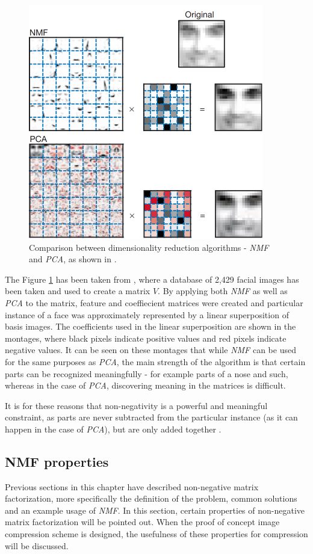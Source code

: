 \documentclass[thesis=M,english]{FITthesis}[2012/10/20]
\begin{document}
\begin{figure}[h]
  \centering
  \includegraphics{nmfpca-comparison}
  \caption[Comparison between dimensionality reduction algorithms]{Comparison between dimensionality reduction algorithms - \emph{NMF} and \emph{PCA},
           as shown in \cite{lee99}.}
  \label{fig:nmfpca-comparison}
\end{figure}

The Figure \ref{fig:nmfpca-comparison} has been taken from \cite{lee99}, where a database of
2,429 facial images has been taken and used to create a matrix $V$. By
applying both \emph{NMF} as well as \emph{PCA} to the matrix, feature
and coeffiecient matrices were created and particular instance of a
face was approximately represented by a linear superposition of basis
images. The coefficients used in the linear superposition are shown in the
montages, where black pixels indicate positive values and red pixels indicate
negative values. It can be seen on these montages that while \emph{NMF}
can be used for the same purposes as \emph{PCA}, the main strength of the
algorithm is that certain parts can be recognized meaningfully - for example
parts of a nose and such, whereas in the case of \emph{PCA}, discovering
meaning in the matrices is difficult.

It is for these reasons that non-negativity is a powerful and meaningful
constraint, as parts are never subtracted from the particular instance
(as it can happen in the case of \emph{PCA}), but are only added together \cite{nmf-phd-thesis}.


\subsection{NMF properties}
Previous sections in this chapter have described non-negative matrix factorization,
more specifically the definition of the problem, common solutions and an example
usage of \emph{NMF}. In this section, certain properties of non-negative matrix
factorization will be pointed out. When the proof of concept image compression scheme
is designed, the usefulness of these properties for compression will be discussed.
\end{document}
